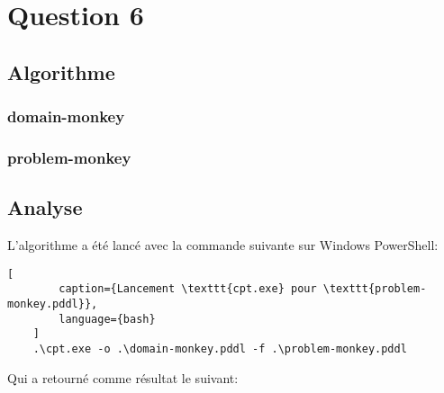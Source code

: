 \documentclass[../CSC_5RO16_TA_TP5.tex]{subfiles}
\begin{document}
\section{Question 6}
% 

\subsection{Algorithme}

\subsubsection{domain-monkey}
\begin{scriptsize}\mycode
    
\end{scriptsize}

\subsubsection{problem-monkey}
\begin{scriptsize}\mycode
    
\end{scriptsize}

\subsection{Analyse}

\noindent L'algorithme a été lancé avec la commande suivante sur Windows PowerShell:

\begin{scriptsize}\mycode
	\begin{lstlisting}[
        caption={Lancement \texttt{cpt.exe} pour \texttt{problem-monkey.pddl}},
        language={bash}
    ]
    .\cpt.exe -o .\domain-monkey.pddl -f .\problem-monkey.pddl
    \end{lstlisting}
\end{scriptsize}

\noindent Qui a retourné comme résultat le suivant:
\end{document}
